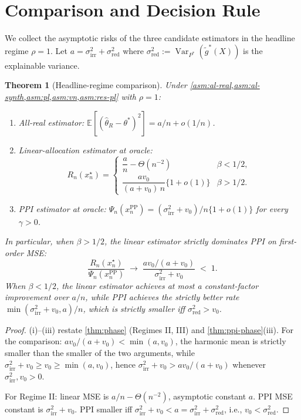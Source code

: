\documentclass[11pt]{article}
\theoremstyle{plain}
\newtheorem{theorem}{Theorem}[section]
\theoremstyle{definition}
\theoremstyle{remark}
\newcommand{\E}{\mathbb{E}}
\newcommand{\Var}{\operatorname{Var}}
\begin{document}
\section{Comparison and Decision Rule}
\label{sec:compare}

We collect the asymptotic risks of the three candidate estimators in the headline regime $\rho=1$. Let $a=\sigma_{\mathrm{irr}}^2+\sigma_{\mathrm{red}}^2$ where $\sigma_{\mathrm{red}}^2:=\Var_{P^*}(\tilde g^*(X))$ is the explainable variance.

\begin{theorem}[Headline-regime comparison]\label{thm:compare}
Under \cref{asm:al-real,asm:al-synth,asm:pl,asm:vn,asm:res-pl} with $\rho=1$:
\begin{enumerate}[label=\rm(\roman*),leftmargin=*]
\item All-real estimator: $\E[(\hat\theta_R-\theta^*)^2]=a/n+o(1/n)$.
\item Linear-allocation estimator at oracle:
\begin{equation*}
R_n(x_n^\star)=\begin{cases}\dfrac{a}{n}-\Theta(n^{-2}) & \beta<1/2,\\[6pt]\dfrac{av_0}{(a+v_0)\,n}\{1+o(1)\} & \beta>1/2.\end{cases}
\end{equation*}
\item PPI estimator at oracle: $\Psi_n(x_n^{\mathrm{PP}})=(\sigma_{\mathrm{irr}}^2+v_0)/n\{1+o(1)\}$ for every $\gamma>0$.
\end{enumerate}
In particular, when $\beta>1/2$, the linear estimator strictly dominates PPI on first-order MSE:
\begin{equation*}
\frac{R_n(x_n^\star)}{\Psi_n(x_n^{\mathrm{PP}})}\;\to\;\frac{av_0/(a+v_0)}{\sigma_{\mathrm{irr}}^2+v_0}\;<\;1.
\end{equation*}
When $\beta<1/2$, the linear estimator achieves at most a constant-factor improvement over $a/n$, while PPI achieves the strictly better rate $\min(\sigma_{\mathrm{irr}}^2+v_0,a)/n$, which is strictly smaller iff $\sigma_{\mathrm{red}}^2>v_0$.
\end{theorem}

\begin{proof}
(i)–(iii) restate \cref{thm:phase} (Regimes II, III) and \cref{thm:ppi-phase}(iii). For the comparison: $av_0/(a+v_0)<\min(a,v_0)$, the harmonic mean is strictly smaller than the smaller of the two arguments, while $\sigma_{\mathrm{irr}}^2+v_0\ge v_0\ge\min(a,v_0)$, hence $\sigma_{\mathrm{irr}}^2+v_0>av_0/(a+v_0)$ whenever $\sigma_{\mathrm{irr}}^2,v_0>0$.

For Regime II: linear MSE is $a/n-\Theta(n^{-2})$, asymptotic constant $a$. PPI MSE constant is $\sigma_{\mathrm{irr}}^2+v_0$. PPI smaller iff $\sigma_{\mathrm{irr}}^2+v_0<a=\sigma_{\mathrm{irr}}^2+\sigma_{\mathrm{red}}^2$, i.e., $v_0<\sigma_{\mathrm{red}}^2$.
\end{proof}
\end{document}
